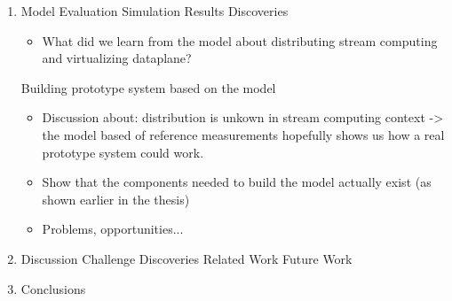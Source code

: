 \begin{enumerate}
\item Model Evaluation
  \subitem Simulation Results
  \subitem Discoveries
    \begin{itemize}[leftmargin=45px]
      \item What did we learn from the model about distributing stream computing and virtualizing dataplane?
    \end{itemize}
  \subitem Building prototype system based on the model
    \begin{itemize}[leftmargin=45px]
      \item Discussion about: distribution is unkown in stream computing context -> the model based of reference measurements hopefully shows us how a real prototype system could work.
      \item Show that the components needed to build the model actually exist (as shown earlier in the thesis)
      \item Problems, opportunities...
    \end{itemize}


\item Discussion
  \subitem Challenge
  \subitem Discoveries
  \subitem Related Work
  \subitem Future Work

\item Conclusions
\end{enumerate}

